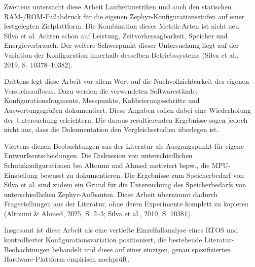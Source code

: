 Zweitens untersucht diese Arbeit Laufzeitmetriken und auch den statischen RAM-/ROM-Fu{\ss}abdruck f{\"u}r die eigenen Zephyr-Konfigurationsstufen auf einer festgelegten Zielplattform. Die Kombination dieser Metrik-Arten ist nicht neu. Silva et al. Achten schon auf Leistung, Zeitvorhersagbarkeit, Speicher und Energieverbrauch. Der weitere Schwerpunkt dieser Untersuchung liegt auf der Variation der Konfiguration innerhalb desselben Betriebssystems (Silva et al., 2019, S. 10378--10382).

Drittens legt diese Arbeit vor allem Wert auf die Nachvollziehbarkeit des eigenen Versuchsaufbaus. Dazu werden die verwendeten Softwarest{\"a}nde, Konfigurationsfragmente, Messpunkte, Kalibrierungsschritte und Auswertungsgr{\"o}{\ss}en dokumentiert. Diese Angaben sollen dabei eine Wiederholung der Untersuchung erleichtern. Die daraus resultierenden Ergebnisse sagen jedoch nicht aus, dass die Dokumentation den Vergleichsstudien {\"u}berlegen ist.

Viertens dienen Beobachtungen aus der Literatur als Ausgangspunkt f{\"u}r eigene Entwurfsentscheidungen. Die Diskussion von unterschiedlichen Schutzkonfigurationen bei Altoumi und Ahmed motiviert bspw., die MPU-Einstellung bewusst zu dokumentieren. Die Ergebnisse zum Speicherbedarf von Silva et al. sind zudem ein Grund f{\"u}r die Untersuchung des Speicherbedarfs von unterschiedlichen Zephyr-Aufbauten. Diese Arbeit {\"u}bernimmt dadurch Fragestellungen aus der Literatur, ohne deren Experimente komplett zu kopieren (Altoumi \& Ahmed, 2025, S. 2--3; Silva et al., 2019, S. 10381).

Insgesamt ist diese Arbeit als eine vertiefte Einzelfallanalyse eines RTOS und kontrollierter Konfigurationsvariation positioniert, die bestehende Literatur-Beobachtungen behandelt und diese auf einer einzigen, genau spezifizierten Hardware-Plattform empirisch nachpr{\"u}ft.
